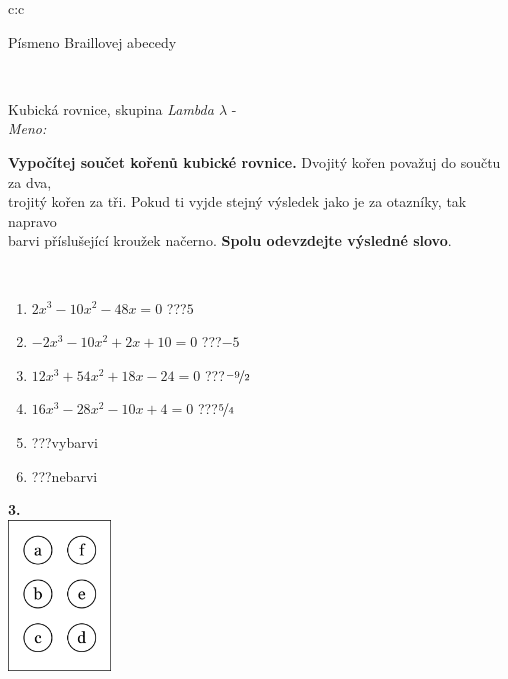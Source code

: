 \documentclass[10pt]{report}
\begin{document}
\begin{tabular}{c:c}
\begin{minipage}[c][104.5mm][t]{0.5\linewidth}
\begin{center}
\begin{minipage}{0.20\linewidth}
\begin{center}
{\small Písmeno Braillovej abecedy}
\end{center}
\end{minipage}
\end{center}
\end{minipage}
\\ \hdashline
\begin{minipage}[c][104.5mm][t]{0.5\linewidth}
\begin{center}
\vspace{7mm}
{\huge Kubická rovnice, skupina \textit{Lambda $\lambda$} -}\\[5mm]
\textit{Meno:}\phantom{xxxxxxxxxxxxxxxxxxxxxxxxxxxxxxxxxxxxxxxxxxxxxxxxxxxxxxxxxxxxxxxxx}\\[5mm]
\begin{minipage}{0.95\linewidth}
\textbf{Vypočítej součet kořenů kubické rovnice.} Dvojitý kořen považuj do součtu za dva,\\trojitý kořen za tři. Pokud ti vyjde stejný výsledek jako je za otazníky, tak napravo\\barvi příslušející kroužek načerno. \textbf{Spolu odevzdejte výsledné slovo}.
\end{minipage}
\\[1mm]
\begin{minipage}{0.79\linewidth}
\begin{center}
\begin{varwidth}{\linewidth}
\begin{enumerate}
\Large
\item $2x^3-10x^2-48x=0$\quad \dotfill\; ???\;\dotfill \quad $5$
\item $-2x^3-10x^2+2x+10=0$\quad \dotfill\; ???\;\dotfill \quad $-5$
\item $12x^3+54x^2+18x-24=0$\quad \dotfill\; ???\;\dotfill \quad $\nicefrac{-9}{2}$
\item $16x^3-28x^2-10x+4=0$\quad \dotfill\; ???\;\dotfill \quad $\nicefrac{5}{4}$
\item \quad \dotfill\; ???\;\dotfill \quad vybarvi
\item \quad \dotfill\; ???\;\dotfill \quad nebarvi
\end{enumerate}
\end{varwidth}
\end{center}
\end{minipage}
\begin{minipage}{0.20\linewidth}
\begin{center}
{\Huge\bfseries 3.} \\[2mm]
\includegraphics[height=40mm]{../images/braille.png}

\end{center}
\end{minipage}
\end{center}
\end{minipage}
\end{tabular}
\end{document}
